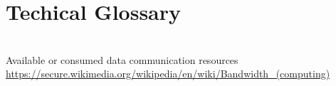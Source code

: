 \section{Techical Glossary}
\begin{description}\label{glossary}

\item[Bandwidth]\label{glossary:bandwidth} \hfill\\
Available or consumed data communication resources \\ \url{https://secure.wikimedia.org/wikipedia/en/wiki/Bandwidth_(computing)}

\end{description}

